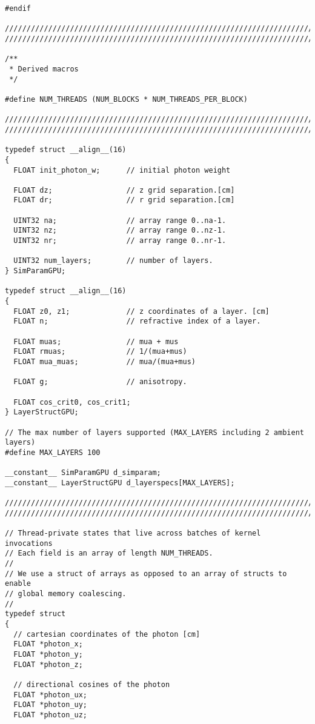 \begin{lstlisting}
#endif

//////////////////////////////////////////////////////////////////////////////
//////////////////////////////////////////////////////////////////////////////

/**
 * Derived macros
 */

#define NUM_THREADS (NUM_BLOCKS * NUM_THREADS_PER_BLOCK)

//////////////////////////////////////////////////////////////////////////////
//////////////////////////////////////////////////////////////////////////////

typedef struct __align__(16)
{
  FLOAT init_photon_w;      // initial photon weight 

  FLOAT dz;                 // z grid separation.[cm] 
  FLOAT dr;                 // r grid separation.[cm] 

  UINT32 na;                // array range 0..na-1. 
  UINT32 nz;                // array range 0..nz-1. 
  UINT32 nr;                // array range 0..nr-1. 

  UINT32 num_layers;        // number of layers. 
} SimParamGPU;

typedef struct __align__(16)
{
  FLOAT z0, z1;             // z coordinates of a layer. [cm] 
  FLOAT n;                  // refractive index of a layer. 

  FLOAT muas;               // mua + mus 
  FLOAT rmuas;              // 1/(mua+mus) 
  FLOAT mua_muas;           // mua/(mua+mus)

  FLOAT g;                  // anisotropy.

  FLOAT cos_crit0, cos_crit1;
} LayerStructGPU;

// The max number of layers supported (MAX_LAYERS including 2 ambient layers)
#define MAX_LAYERS 100

__constant__ SimParamGPU d_simparam;
__constant__ LayerStructGPU d_layerspecs[MAX_LAYERS];

//////////////////////////////////////////////////////////////////////////////
//////////////////////////////////////////////////////////////////////////////

// Thread-private states that live across batches of kernel invocations
// Each field is an array of length NUM_THREADS.
//
// We use a struct of arrays as opposed to an array of structs to enable
// global memory coalescing.
//
typedef struct
{
  // cartesian coordinates of the photon [cm]
  FLOAT *photon_x;
  FLOAT *photon_y;
  FLOAT *photon_z;

  // directional cosines of the photon
  FLOAT *photon_ux;
  FLOAT *photon_uy;
  FLOAT *photon_uz;


\end{lstlisting}
